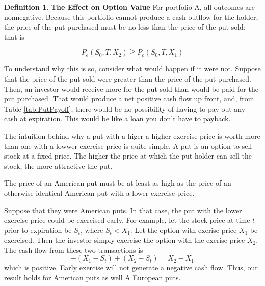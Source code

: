 \documentclass{book}
\theoremstyle{definition}
\newtheorem{definition}{Definition}[section]
\theoremstyle{remark}
\begin{document}
\begin{definition}{\textbf{The Effect on Option Value}}
                For portfolio A, all outcomes are nonnegative. Because this portfolio cannot produce a cash outflow for the holder, the price of the put purchased must be no less than the price of the put sold; that is 
                
                    \begin{equation}
                        P_e(S_0,T,X_2) \geqq P_e(S_0,T,X_1)
                    \end{equation} 
                    
                To understand why this is so, consider what would happen if it were not. Suppose that the price of the put sold were greater than the price of the put purchased. Then, an investor would receive more for the put sold than would be paid for the put purchased. That would produce a net positive cash flow up front, and, from Table \ref{tab:PutPayoff}, there would be no possibility of having to pay out any cash at expiration. This would be like a loan you don't have to payback. 
                    
                The intuition behind  why a put with a higer a higher exercise price is worth more than one with a lowwer exercise price is quite simple. A put is an option to sell stock at a fixed price. The higher the price at which the put holder  can sell the stock, the more attractive the put. 
                
        \begin{tcolorbox}[colback=blue!5!white,colframe=blue!75!black, title=Sticky Note]
            The price of an American put must be at least as high as the price of an otherwise identical American put with a lower exercise price.
        \end{tcolorbox}            
                
                Suppose that they were American puts. In that case, the put with the lower exercise price could be exercised early. For example, let the stock price at time $t$ prior to expiration be $S_t$, where $S_t < X_1$. Let the option with exerise price $X_1$ be exercised. Then the investor simply exercise the option with the exerise price $X_2$. The cash flow from these two transactions is $$-(X_1 - S_t)+(X_2 - S_t) = X_2 - X_1$$ which is positive. Early exercise will not generate a negative cash flow. Thus, our result holds for American puts as well A European puts.
            \end{definition}
            
\end{document}
